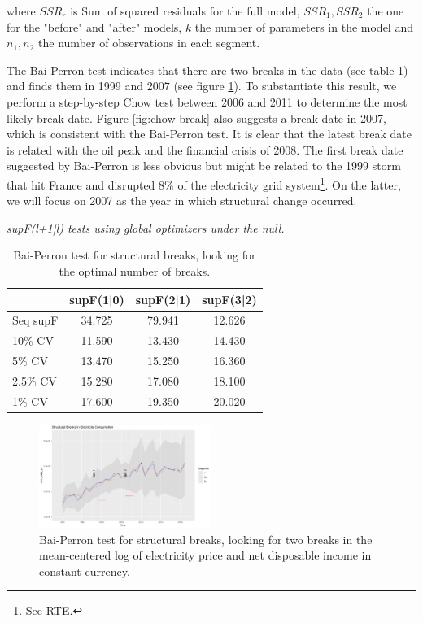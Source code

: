 where $SSR_r$ is Sum of squared residuals for the full model, $SSR_1, SSR_2$ the one for the "before" and "after" models, $k$ the number of parameters in the model and $n_1, n_2$ the number of observations in each segment. 

The Bai-Perron test indicates that there are two breaks in the data (see table \ref{tab:supF_tests}) and finds them in 1999 and 2007 (see figure \ref{fig:bai-perron-break}). To substantiate this result, we perform a step-by-step Chow test between 2006 and 2011 to determine the most likely break date. Figure \ref{fig:chow-break} also suggests a break date in 2007, which is consistent with the Bai-Perron test. It is clear that the latest break date is related with the oil peak and the financial crisis of 2008. The first break date suggested by Bai-Perron is less obvious but might be related to the 1999 storm that hit France and disrupted 8\% of the electricity grid system\footnote{See \href{https://www.osti.gov/etdeweb/servlets/purl/20222814}{RTE}.}. On the latter, we will focus on 2007 as the year in which structural change occurred.

\begin{table}[!htbp] 
    \centering
    \caption{Bai-Perron test for structural breaks, looking for the optimal number of breaks.} \vspace{0.1cm}
    \label{tab:supF_tests}
    \textit{supF(l+1|l) tests using global optimizers under the null.}
    \begin{tabular}{lccc}
        \\[-1.8ex] \toprule
        & \textbf{supF(1|0)} & \textbf{supF(2|1)} & \textbf{supF(3|2)} \\
        \midrule
        Seq supF & 34.725 & 79.941 & 12.626 \\
        \midrule
        10\% CV  & 11.590 & 13.430 & 14.430 \\
        5\% CV   & 13.470 & 15.250 & 16.360 \\
        2.5\% CV & 15.280 & 17.080 & 18.100 \\
        1\% CV   & 17.600 & 19.350 & 20.020 \\
        \bottomrule
    \end{tabular}
\end{table}

\begin{figure}[h]
    \centering
      \includegraphics[width=0.5\textwidth]{Images/structural_breaks.jpeg}
      \caption{Bai-Perron test for structural breaks, looking for two breaks in the mean-centered log of electricity price and net disposable income in constant currency.}
    \label{fig:bai-perron-break}
  \end{figure}

